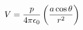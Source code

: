 \documentclass[preview]{standalone}
\begin{document}
\begin{align*}
V  =  {p  \over  4\pi\epsilon_0}  \left(   {a\cos\theta  \over  r^2}  \right)
\end{align*}
\end{document}
